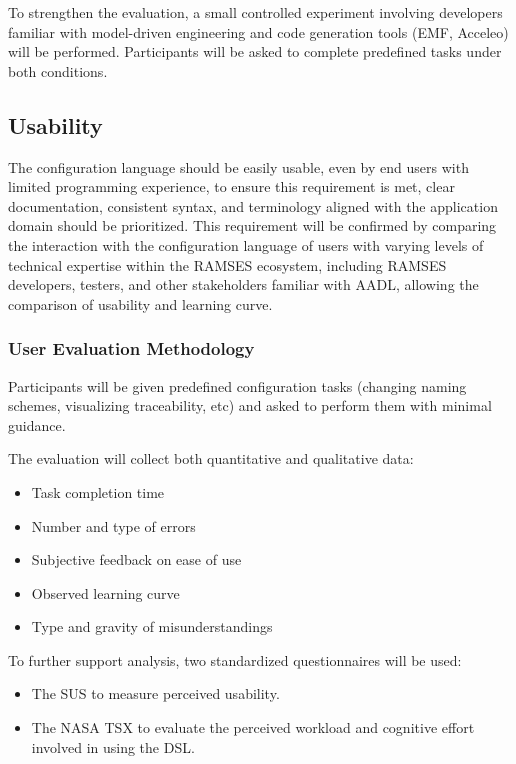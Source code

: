 To strengthen the evaluation, a small controlled experiment involving developers familiar with model-driven engineering and code generation tools (\gls{EMF}, Acceleo) will be performed. Participants will be asked to complete predefined tasks under both conditions.

\subsection*{Usability}

The configuration language should be easily usable, even by end users with limited programming experience, to ensure this requirement is met, clear documentation, consistent syntax, and terminology aligned with the application domain should be prioritized. This requirement will be confirmed by comparing the interaction with the configuration language of users with varying levels of technical expertise within the \gls{RAMSES} ecosystem, including \gls{RAMSES} developers, testers, and other stakeholders familiar with \gls{AADL}, allowing the comparison of usability and learning curve.

\subsubsection*{User Evaluation Methodology}

Participants will be given predefined configuration tasks (changing naming schemes, visualizing traceability, etc) and asked to perform them with minimal guidance.

The evaluation will collect both quantitative and qualitative data:
\begin{itemize}
	\item Task completion time
	\item Number and type of errors
	\item Subjective feedback on ease of use
	\item Observed learning curve
	\item Type and gravity of misunderstandings
\end{itemize}

To further support analysis, two standardized questionnaires will be used:

\begin{itemize}
	\item The \gls{SUS} to measure perceived usability.
	\item The NASA \gls{TSX} to evaluate the perceived workload and cognitive effort involved in using the DSL.
\end{itemize}


